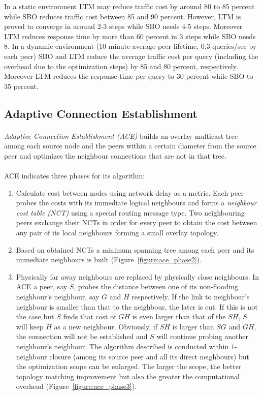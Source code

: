 \documentclass[a4paper,10pt]{article}
\begin{document}
In a static enviromnent LTM may reduce traffic cost by around 80 to 85 percent while SBO reduces traffic cost between 85 and 90 percent. However, LTM  is proved to converge in around 2-3 steps while SBO needs 4-5 steps. Moreover LTM reduces response time by more than 60 percent in 3 steps while SBO needs 8. In a dynamic environment (10 minute average peer lifetime, 0.3 queries/sec by each peer) SBO and LTM reduce the average traffic cost per query (including the overhead due to the optimization steps) by 85 and 80 percent, respectively. Moreover LTM reduces the response time per query to 30 percent while SBO to 35 percent.

\subsection{Adaptive Connection Establishment}

\paragraph{}
\emph{Adaptive Connection Establishment (ACE)} \cite{liu_ace_2004} builds an overlay multicast tree among each source node and the peers within a certain diameter from the source peer and optimizes the neighbour connections that are not in that tree.

\paragraph{}
ACE indicates three phases for its algorithm:
\begin{enumerate}
  \item Calculate cost between nodes using network delay as a metric. Each peer probes the costs with its immediate logical neighbours and forms a \emph{neighbour cost table (NCT)} using a special routing message type. Two neighbouring peers exchange their NCTs in order for every peer to obtain the cost between any pair of its local neighbours forming a small overlay topology.
  \item Based on obtained NCTs a minimum spanning tree among each peer and its immediate neighbours is built (Figure~\ref{figure:ace_phase2}).
  \item Physically far away neighbours are replaced by physically close neighbours. In ACE a peer, say $S$, probes the distance between one of its non-flooding neighbour's neighbour, say $G$ and $H$ respectively. If the link to neighbour's neighbour is smaller than that to the neighbour, the later is cut. If this is not the case but $S$ finds that cost of $GH$ is even larger than that of the $SH$, $S$ will keep $H$ as a new neighbour. Obviously, if $SH$ is larger than $SG$ and $GH$, the connection will not be established and $S$ will continue probing another neighbour's neighbour. The algorithm described is conducted within $1$-neighbour closure (among its source peer and all its direct neighbours) but the optimization scope can be enlarged. The larger the scope, the better topology matching improvement but also the greater the computational overhead (Figure~\ref{figure:ace_phase3}).
\end{enumerate}
\end{document}
